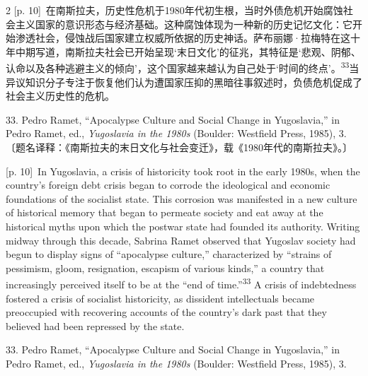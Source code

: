 \documentclass[10pt,a4paper]{article}
\begin{document}
\begin{paracol}{2}
{\scriptsize\color{gray} [p. 10]}\ 在南斯拉夫，历史性危机于1980年代初生根，当时外债危机开始腐蚀社会主义国家的意识形态与经济基础。这种腐蚀体现为一种新的历史记忆文化：它开始渗透社会，侵蚀战后国家建立权威所依据的历史神话。萨布丽娜·拉梅特在这十年中期写道，南斯拉夫社会已开始呈现‘末日文化’的征兆，其特征是‘悲观、阴郁、认命以及各种逃避主义的倾向’，这个国家越来越认为自己处于‘时间的终点’。\nobreak\textsuperscript{33}当异议知识分子专注于恢复他们认为遭国家压抑的黑暗往事叙述时，负债危机促成了社会主义历史性的危机。\par{\small 33. Pedro Ramet, “Apocalypse Culture and Social Change in Yugoslavia,” in Pedro Ramet, ed., \textit{Yugoslavia in the 1980s} (Boulder: Westfield Press, 1985), 3. 〔题名译释：《南斯拉夫的末日文化与社会变迁》，载《1980年代的南斯拉夫》。〕\par}
\switchcolumn
{\scriptsize\color{gray} [p. 10]}\ In Yugoslavia, a crisis of historicity took root in the early 1980s, when the country’s foreign debt crisis began to corrode the ideological and economic foundations of the socialist state. This corrosion was manifested in a new culture of historical memory that began to permeate society and eat away at the historical myths upon which the postwar state had founded its authority. Writing midway through this decade, Sabrina Ramet observed that Yugoslav society had begun to display signs of “apocalypse culture,” characterized by “strains of pessimism, gloom, resignation, escapism of various kinds,” a country that increasingly perceived itself to be at the “end of time.”\nobreak\textsuperscript{33} A crisis of indebtedness fostered a crisis of socialist historicity, as dissident intellectuals became preoccupied with recovering accounts of the country’s dark past that they believed had been repressed by the state.\par{\small 33. Pedro Ramet, “Apocalypse Culture and Social Change in Yugoslavia,” in Pedro Ramet, ed., \textit{Yugoslavia in the 1980s} (Boulder: Westfield Press, 1985), 3.\par}
\switchcolumn*

\end{paracol}
\end{document}

